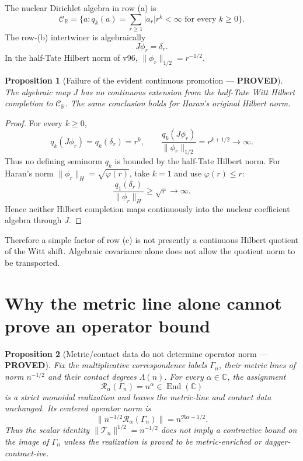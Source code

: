 \documentclass[11pt]{article}
\newcommand{\PROVED}{\textcolor{green!40!black}{\textbf{PROVED}}}
\newtheorem{proposition}{Proposition}
\begin{document}
The nuclear Dirichlet algebra in row (a) is
\[
 \mathcal C_{\mathbb R}
 =\{a:q_k(a)=\sum_{r\ge1}|a_r|r^k<\infty
       \text{ for every }k\ge0\}.
\]
The row-(b) intertwiner is algebraically
\[
 J\phi_r=\delta_r.
\]
In the half-Tate Hilbert norm of v96,
$\|\phi_r\|_{1/2}=r^{-1/2}$.

\begin{proposition}[Failure of the evident continuous promotion ---
\PROVED]
The algebraic map $J$ has no continuous extension from the half-Tate Witt
Hilbert completion to $\mathcal C_{\mathbb R}$.  The same conclusion holds
for Haran's original Hilbert norm.
\end{proposition}

\begin{proof}
For every $k\ge0$,
\[
 q_k(J\phi_r)=q_k(\delta_r)=r^k,
 \qquad
 \frac{q_k(J\phi_r)}{\|\phi_r\|_{1/2}}=r^{k+1/2}\longrightarrow\infty.
\]
Thus no defining seminorm $q_k$ is bounded by the half-Tate Hilbert norm.
For Haran's norm $\|\phi_r\|_H=\sqrt{\varphi(r)}$, take $k=1$ and use
$\varphi(r)\le r$:
\[
 \frac{q_1(\delta_r)}{\|\phi_r\|_H}
 \ge\sqrt r\longrightarrow\infty.
\]
Hence neither Hilbert completion maps continuously into the nuclear
coefficient algebra through $J$.
\end{proof}

Therefore a simple factor of row (c) is not presently a continuous Hilbert
quotient of the Witt shift.  Algebraic covariance alone does not allow the
quotient norm to be transported.

\section{Why the metric line alone cannot prove an operator bound}

\begin{proposition}[Metric/contact data do not determine operator norm ---
\PROVED]
Fix the multiplicative correspondence labels $\Gamma_n$, their metric
lines of norm $n^{-1/2}$ and their contact degrees $\Lambda(n)$.  For every
$\alpha\in\mathbb C$, the assignment
\begin{equation}
             \mathcal R_\alpha(\Gamma_n)=n^\alpha\in\operatorname{End}(\mathbb C)
                                                               \tag{4}
\end{equation}
is a strict monoidal realization and leaves the metric-line and contact
data unchanged.  Its centered operator norm is
\begin{equation}
             \|n^{-1/2}\mathcal R_\alpha(\Gamma_n)\|
             =n^{\Re\alpha-1/2}.                    \tag{5}
\end{equation}
Thus the scalar identity $\|\mathcal T_n\|^{1/2}=n^{-1/2}$ does not imply a
contractive bound on the image of $\Gamma_n$ unless the realization is
proved to be metric-enriched or dagger-contract-ive.
\end{proposition}
\end{document}
